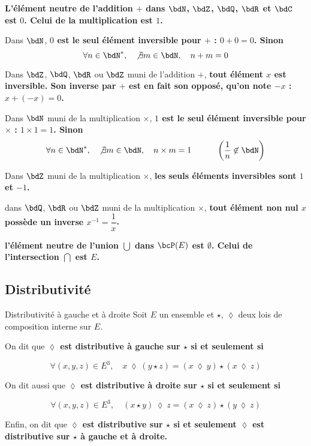 \documentclass[a4paper,french,bookmarks]{article}
\begin{document}
\begin{example}{}{}

    \begin{enumerate}
    
        \ithand \bf{L'élément neutre de l'addition $+$} dans $\bdN$, $\bdZ$, $\bdQ$, $\bdR$ et $\bdC$ est \bf{$0$}. Celui de \bf{la multiplication} est \bf{$1$}.
        
        \ithand Dans $\bdN$, \bf{$0$ est le seul élément inversible} pour $+$ : $0 + 0 = 0$. Sinon 
        \[\forall n \in \bdN^*,\quad \not\exists m \in \bdN,\quad n + m = 0\]
        
        \ithand Dans $\bdZ$, $\bdQ$, $\bdR$ ou $\bdZ$ muni de l'addition $+$, \bf{tout élément $x$ est inversible}. Son inverse par $+$ est en fait son opposé, qu'on note $-x$ : $x + (-x) = 0$.
        
        \ithand Dans $\bdN$ muni de la multiplication $\times$, \bf{$1$ est le seul élément inversible} pour $\times$ : $1 \times 1 = 1$. Sinon
        \[\forall n \in \bdN^*,\quad \not\exists m \in \bdN,\quad n \times m = 1 \qquad\quad\left(\dfrac{1}{n} \not\in \bdN\right)\]
        
        \ithand Dans $\bdZ$ muni de la multiplication $\times$, \bf{les seuls éléments inversibles sont $1$ et $-1$}.
        
        \ithand dans $\bdQ$, $\bdR$ ou $\bdZ$ muni de la multiplication $\times$, \bf{tout élément non nul $x$ possède un inverse $x^{-1} = \dfrac{1}{x}$}.
        
        \ithand \bf{l'élément neutre de l'union $\bigcup$} dans $\bcP(E)$ est \bf{$\emptyset$}. Celui de \bf{l'intersection $\bigcap$} est \bf{$E$}.
    \end{enumerate}
    
\end{example}

\subsection{Distributivité}

\begin{definition}{Distributivité à gauche et à droite}{}
    Soit $E$ un ensemble et $\star$, $\lozenge$ deux lois de composition interne sur $E$.
    
    On dit que \bf{$\lozenge$ est distributive à gauche sur $\star$} si et seulement si
    
    \[ \forall (x, y, z) \in E^3,\quad x \ \lozenge \ (y \star z) = (x \ \lozenge \ y) \star (x \ \lozenge \ z)\]
    
    On dit aussi que \bf{$\lozenge$ est distributive à droite sur $\star$} si et seulement si
    
    \[ \forall (x, y, z) \in E^3,\quad (x \star y)\  \lozenge \ z = (x\ \lozenge \ z) \star (y\ \lozenge\ z)\]
    
    Enfin, on dit que \bf{$\lozenge$ est distributive sur $\star$} si et seulement $\lozenge$ est distributive sur $\star$ à gauche et à droite.
\end{definition}
\end{document}
